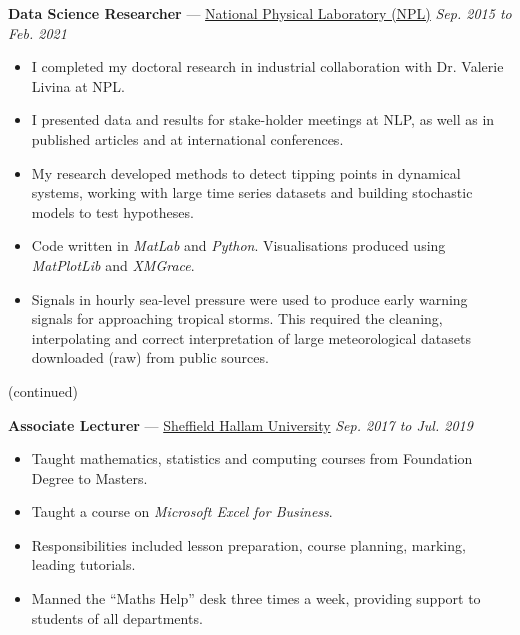 \documentclass[10pt]{article}
\newcommand{\sectioncont}[1]{
	\pagebreak[3]%
	\hyphenpenalty=10000%
	\vspace{\baselineskip}%
	\noindent{\scshape #1} (continued)%
	\vspace{\baselineskip}\par
}
\newenvironment{innerlist}[1][\enskip\textbullet]{
	\begin{itemize}[#1,leftmargin=*,parsep=0pt,itemsep=1pt,topsep=2pt,partopsep=0pt]
}{\end{itemize}}
\begin{document}
\vspace{14pt}
\textbf{Data Science Researcher} — \href{http://www.npl.co.uk}{National Physical Laboratory (NPL)} \hfill \emph{Sep. 2015 to Feb. 2021} \\
\vspace{-6pt}
\begin{innerlist}
	\item I completed my doctoral research in industrial collaboration with Dr. Valerie Livina at NPL.
	\item I presented data and results for stake-holder meetings at NLP, as well as in published articles and at international conferences. 
	\item My research developed methods to detect tipping points in dynamical systems, working with large time series datasets and building stochastic models to test hypotheses. 
	\item Code written in \textit{MatLab} and \textit{Python}. Visualisations produced using \textit{MatPlotLib} and \textit{XMGrace}.
	\item Signals in hourly sea-level pressure were used to produce early warning signals for approaching tropical storms. This required the cleaning, interpolating and correct interpretation of large meteorological datasets downloaded (raw) from public sources.
\end{innerlist}


\pagebreak

\sectioncont{Professional Experience}

\textbf{Associate Lecturer} — \href{https://www.shu.ac.uk/about-us/academic-departments/engineering-and-mathematics}{Sheffield Hallam University} \hfill \emph{Sep. 2017 to Jul. 2019} \\
\vspace{-6pt}
\begin{innerlist}
	\item Taught mathematics, statistics and computing courses from Foundation Degree to Masters.
	\item Taught a course on \textit{Microsoft Excel for Business}.
	\item Responsibilities included lesson preparation, course planning, marking, leading tutorials. 
	\item Manned the ``Maths Help'' desk three times a week, providing support to students of all departments.
\end{innerlist} 
\vspace{10pt}
\end{document}
